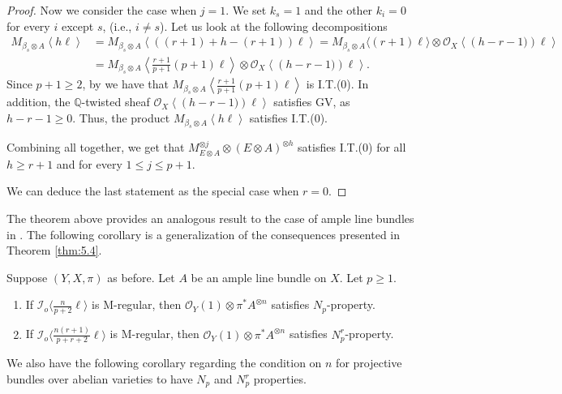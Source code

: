 \documentclass[11pt,letter]{amsart}
\numberwithin{equation}{section}
\begin{document}
\begin{proof}
Now we consider the case when $j=1$. We set $k_s=1$ and the other $k_i=0$ for every $i$ except $s$, (i.e., $i\neq s$). 
Let us look at the following decompositions
   \begin{align*}
       M_{\beta_s\otimes A}\left\langle h\ell\right\rangle&
     =  M_{\beta_s\otimes A}\left\langle ((r+1)+ h-(r+1))\ell\right\rangle
       = M_{\beta_s\otimes A}\langle (r+1)\ell\rangle\otimes\mathcal{O}_X\left\langle \left( h-r-1)\right)\ell\right\rangle\\
       &= M_{\beta_s\otimes A}\left\langle\frac{r+1}{p+1}(p+1)\ell\right\rangle\otimes \mathcal{O}_X\left\langle \left(h-r-1)\right)\ell\right\rangle.
   \end{align*}
   Since $p+1\geq 2$, by \cite[Proposition 6.2]{Ito22} we have that $M_{\beta_s\otimes A}\left\langle\frac{r+1}{p+1}(p+1)\ell\right\rangle$ is I.T.(0). In addition, the $\mathbb{Q}$-twisted sheaf $\mathcal{O}_X\left\langle \left(h-r-1)\right)\ell\right\rangle$ satisfies GV, as $h-r-1\geq 0$. Thus, the product $M_{\beta_s\otimes A}\left\langle h\ell\right\rangle$ satisfies I.T.(0). 
   
   Combining all together, we get that $M_{E\otimes A}^{\otimes j}\otimes (E\otimes A)^{\otimes h}$ satisfies I.T.(0) for all $h\geq r+1$ and for every $1\leq j\leq p+1$.

We can deduce the last statement as the special case when $r=0$. %
\end{proof}

The theorem above provides an analogous result to the case of ample line bundles in \cite[Theorem 1.5]{Ito22}. 
The following corollary is a generalization of the consequences presented in Theorem \ref{thm:5.4}.
\begin{cor}
Suppose $(Y,X,\pi)$ as before. 
Let $A$ be an ample line bundle on $X$. Let $p\geq 1$.
\begin{enumerate}
\item If $\mathcal{I}_o\langle \frac{n}{p+2}\ell\rangle$ is M-regular, then $\mathcal{O}_Y(1)\otimes\pi^*A^{\otimes n}$ satisfies $N_p$-property. 
\item If $\mathcal{I}_o\langle \frac{n(r+1)}{p+r+2}\ell\rangle$ is M-regular, then $\mathcal{O}_Y(1)\otimes\pi^*A^{\otimes n}$ satisfies $N_p^r$-property. 
\end{enumerate}
\end{cor}

We also have the following corollary regarding the condition on $n$ for projective bundles over abelian varieties to have $N_p$ and $N_p^r$ properties. 
\end{document}
